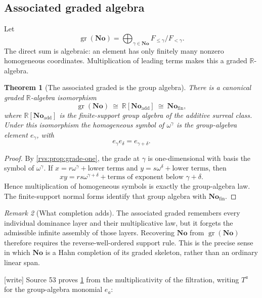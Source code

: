 \documentclass[11pt,letterpaper]{article}
\numberwithin{equation}{section}
\newtheorem{theorem}{Theorem}[section]
\theoremstyle{definition}
\theoremstyle{remark}
\newtheorem{remark}[theorem]{Remark}
\newcommand{\No}{\mathbf{No}}
\newcommand{\R}{\mathbb{R}}
\newcommand{\Fin}{\No_{\mathrm{fin}}}
\newcommand{\gr}{\operatorname{gr}}
\newcommand{\wtag}{\textup{[write]}}%
\begin{document}
\subsection{Associated graded algebra}\label{rvs:subsec:graded}

Let
\begin{equation}\label{rvs:eq:gr-def}
  \gr(\No)=\bigoplus_{\gamma\in\No}
  F_{\le\gamma}/F_{<\gamma}.
\end{equation}
The direct sum is algebraic: an element has only finitely many nonzero
homogeneous coordinates.  Multiplication of leading terms makes this a graded
\(\R\)-algebra.

\begin{theorem}[The associated graded is the group algebra]
\label{rvs:thm:graded}
\label{rvs:cv:thm:associated-graded}
There is a canonical graded \(\R\)-algebra isomorphism
\begin{equation}\label{rvs:eq:gr-group-algebra}
  \gr(\No)\ \cong\ \R[\No_{\mathrm{add}}]
  \ \cong\ \Fin,
\end{equation}
where \(\R[\No_{\mathrm{add}}]\) is the finite-support group algebra of the
additive surreal class.  Under this isomorphism the homogeneous symbol of
\(\omega^\gamma\) is the group-algebra element \(e_\gamma\), with
\[
 e_\gamma e_\delta=e_{\gamma+\delta}.
\]
\end{theorem}

\begin{proof}
By \cref{rvs:prop:grade-one}, the grade at \(\gamma\) is one-dimensional with
basis the symbol of \(\omega^\gamma\).  If
\(x=r\omega^\gamma+\text{lower terms}\) and
\(y=s\omega^\delta+\text{lower terms}\), then
\[
 xy=rs\omega^{\gamma+\delta}+\text{terms of exponent below }\gamma+\delta.
\]
Hence multiplication of homogeneous symbols is exactly the group-algebra
law.  The finite-support normal forms identify that group algebra with
\(\Fin\).
\end{proof}

\begin{remark}[What completion adds]
The associated graded remembers every individual dominance layer and their
multiplicative law, but it forgets the admissible infinite assembly of those
layers.  Recovering \(\No\) from \(\gr(\No)\) therefore requires the
reverse-well-ordered support rule.  This is the precise sense in which
\(\No\) is a Hahn completion of its graded skeleton, rather than an ordinary
linear span.
\end{remark}

\noindent\wtag{} Source 53 proves \cref{rvs:thm:graded} from the
multiplicativity of the filtration, writing \(T^a\) for the group-algebra
monomial \(e_a\):
\end{document}
